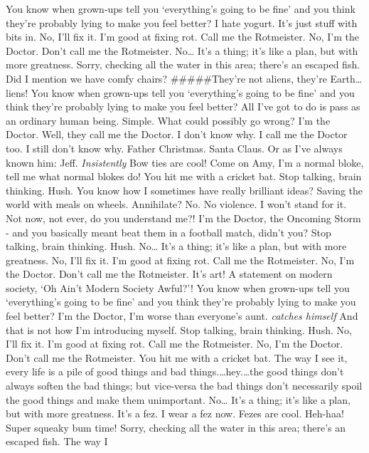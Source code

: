 \documentclass[]{report}
\begin{document}
You know when grown-ups tell you `everything's going to be fine' and you
think they're probably lying to make you feel better? I hate yogurt.
It's just stuff with bits in. No, I'll fix it. I'm good at fixing rot.
Call me the Rotmeister. No, I'm the Doctor. Don't call me the
Rotmeister. No\ldots{} It's a thing; it's like a plan, but with more
greatness. Sorry, checking all the water in this area; there's an
escaped fish. Did I mention we have comfy chairs? \#\#\#\#\#They're not
aliens, they're Earth\ldots{}liens!\newline
You know when grown-ups tell you `everything's going to be fine' and you
think they're probably lying to make you feel better? All I've got to do
is pass as an ordinary human being. Simple. What could possibly go
wrong? I'm the Doctor. Well, they call me the Doctor. I don't know why.
I call me the Doctor too. I still don't know why. Father Christmas.
Santa Claus. Or as I've always known him: Jeff. \emph{Insistently} Bow
ties are cool! Come on Amy, I'm a normal bloke, tell me what normal
blokes do! You hit me with a cricket bat. Stop talking, brain thinking.
Hush. You know how I sometimes have really brilliant ideas? Saving the
world with meals on wheels. Annihilate? No. No violence. I won't stand
for it. Not now, not ever, do you understand me?! I'm the Doctor, the
Oncoming Storm - and you basically meant beat them in a football match,
didn't you? Stop talking, brain thinking. Hush. No\ldots{} It's a thing;
it's like a plan, but with more greatness. No, I'll fix it. I'm good at
fixing rot. Call me the Rotmeister. No, I'm the Doctor. Don't call me
the Rotmeister. It's art! A statement on modern society, `Oh Ain't
Modern Society Awful?'! You know when grown-ups tell you `everything's
going to be fine' and you think they're probably lying to make you feel
better? I'm the Doctor, I'm worse than everyone's aunt. \emph{catches
himself} And that is not how I'm introducing myself. Stop talking, brain
thinking. Hush. No, I'll fix it. I'm good at fixing rot. Call me the
Rotmeister. No, I'm the Doctor. Don't call me the Rotmeister. You hit me
with a cricket bat. The way I see it, every life is a pile of good
things and bad things.\ldots{}hey.\ldots{}the good things don't always
soften the bad things; but vice-versa the bad things don't necessarily
spoil the good things and make them unimportant. No\ldots{} It's a
thing; it's like a plan, but with more greatness. It's a fez. I wear a
fez now. Fezes are cool. Heh-haa! Super squeaky bum time! Sorry,
checking all the water in this area; there's an escaped fish. The way I
\end{document}
